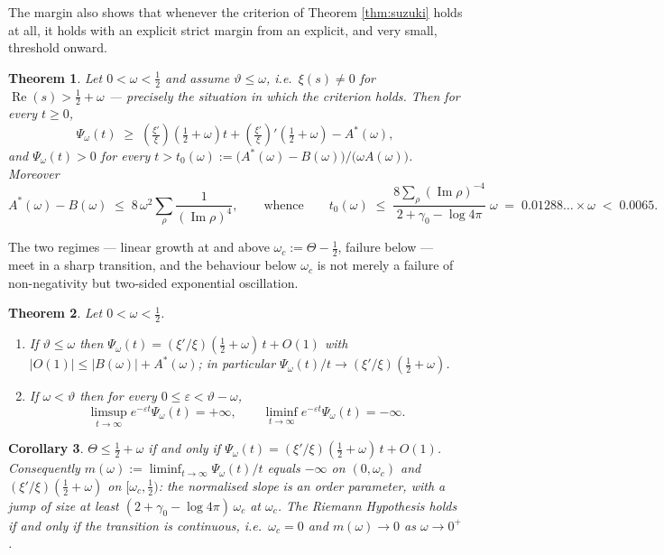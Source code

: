 \documentclass[11pt,reqno]{amsart}
\theoremstyle{plain}
\newtheorem{theorem}{Theorem}[section]
\newtheorem{corollary}[theorem]{Corollary}
\theoremstyle{definition}
\newcommand{\Rp}{\operatorname{Re}}
\newcommand{\Ip}{\operatorname{Im}}
\newcommand{\lxi}[1]{\left(\tfrac{\xi'}{\xi}\right)\!#1}
\begin{document}
The margin also shows that whenever the criterion of Theorem \ref{thm:suzuki} holds at all, it holds
with an explicit strict margin from an explicit, and very small, threshold onward.

\begin{theorem}\label{thm:threshold}
Let $0<\omega<\tfrac12$ and assume $\vartheta\le\omega$, i.e.\ $\xi(s)\neq0$ for
$\Rp(s)>\tfrac12+\omega$ --- precisely the situation in which the criterion holds. Then for every
$t\ge0$,
\[
  \Psi_\omega(t)\;\ge\;\lxi{\left(\tfrac12+\omega\right)}t+\lxi{'\left(\tfrac12+\omega\right)}
  -A^{*}(\omega),
\]
and $\Psi_\omega(t)>0$ for every $t>t_0(\omega):=\bigl(A^{*}(\omega)-B(\omega)\bigr)/\bigl(\omega
A(\omega)\bigr)$. Moreover
\[
  A^{*}(\omega)-B(\omega)\;\le\;8\,\omega^{2}\sum_\rho\frac{1}{(\Ip\rho)^{4}},
  \qquad\text{whence}\qquad
  t_0(\omega)\;\le\;\frac{8\sum_\rho(\Ip\rho)^{-4}}{2+\gamma_0-\log4\pi}\;\omega
  \;=\;0.01288\ldots\times\omega\;<\;0.0065 .
\]
\end{theorem}

The two regimes --- linear growth at and above $\omega_c:=\Theta-\tfrac12$, failure below --- meet
in a sharp transition, and the behaviour below $\omega_c$ is not merely a failure of
non-negativity but two-sided exponential oscillation.

\begin{theorem}\label{thm:transition}
Let $0<\omega<\tfrac12$.
\begin{enumerate}
\item[(i)] If $\vartheta\le\omega$ then
$\Psi_\omega(t)=(\xi'/\xi)(\tfrac12+\omega)\,t+O(1)$ with $|O(1)|\le|B(\omega)|+A^{*}(\omega)$;
in particular $\Psi_\omega(t)/t\to(\xi'/\xi)(\tfrac12+\omega)$.
\item[(ii)] If $\omega<\vartheta$ then for every $0\le\varepsilon<\vartheta-\omega$,
\[
  \limsup_{t\to\infty}e^{-\varepsilon t}\Psi_\omega(t)=+\infty,
  \qquad
  \liminf_{t\to\infty}e^{-\varepsilon t}\Psi_\omega(t)=-\infty .
\]
\end{enumerate}
\end{theorem}

\begin{corollary}\label{cor:graded}
$\Theta\le\tfrac12+\omega$ if and only if
$\Psi_\omega(t)=(\xi'/\xi)(\tfrac12+\omega)\,t+O(1)$. Consequently
$m(\omega):=\liminf_{t\to\infty}\Psi_\omega(t)/t$ equals $-\infty$ on $(0,\omega_c)$ and
$(\xi'/\xi)(\tfrac12+\omega)$ on $[\omega_c,\tfrac12)$: the normalised slope is an order
parameter, with a jump of size at least $(2+\gamma_0-\log4\pi)\,\omega_c$ at $\omega_c$. The
Riemann Hypothesis holds if and only if the transition is continuous, i.e.\ $\omega_c=0$ and
$m(\omega)\to0$ as $\omega\to0^{+}$.
\end{corollary}
\end{document}
